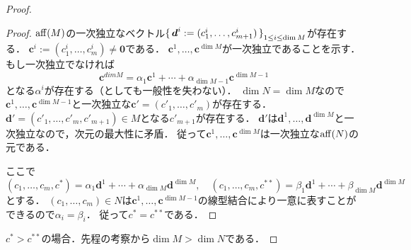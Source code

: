\begin{proof}
\begin{proof}
    \(\operatorname{aff}(M)\)の一次独立なベクトル\(\set{\boldsymbol{d}^i := (c^i_1, \ldots, c^i_{m+1})}_{1\leq i\leq \dim M} \)が存在する．
    \(\boldsymbol{c}^i := (c^i_1, \ldots, c^i_m) \neq \boldsymbol{0}\)である．
    \(\boldsymbol{c}^1 , \ldots, \boldsymbol{c}^{\dim M}\)が一次独立であることを示す．
    もし一次独立でなければ
    \[ \boldsymbol{c}^{dim M} = \alpha_1 \boldsymbol{c}^1 + \cdots +  \alpha_{\dim M-1} \boldsymbol{c}^{\dim M-1} \]
    となる\(\alpha^i\)が存在する（としても一般性を失わない）．
    \(\dim N = \dim M\)なので\(\boldsymbol{c}^1, \ldots, \boldsymbol{c}^{\dim M-1}\)と一次独立な\(\boldsymbol{c}' = (c'_1, \ldots, c'_m)\)が存在する．
    \(\boldsymbol{d}' = (c'_1, \ldots, c'_m, c'_{m+1}) \in M\)となる\(c'_{m+1}\)が存在する．
    \(\boldsymbol{d}'\)は\(\boldsymbol{d}^1, \ldots, \boldsymbol{d}^{\dim M}\)と一次独立なので，次元の最大性に矛盾．
    従って\(\boldsymbol{c}^1, \ldots, \boldsymbol{c}^{\dim M}\)は一次独立な\(\operatorname{aff}(N)\)の元である．

    ここで
    \[
    (c_1, \ldots, c_m, c^*) = \alpha_1 \boldsymbol{d}^1 + \cdots + \alpha_{\dim M} \boldsymbol{d}^{\dim M} , \quad
    (c_1, \ldots, c_m, c^{**}) = \beta_1 \boldsymbol{d}^1 + \cdots + \beta_{\dim M} \boldsymbol{d}^{\dim M}
    \]
    とする．
    \((c_1, \ldots, c_m) \in N\)は\(\boldsymbol{c}^1, \ldots, \boldsymbol{c}^{\dim M-1}\)の線型結合により一意に表すことができるので\(\alpha_i = \beta_i\)．
    従って\(c^* = c^{**}\)である．
  \end{proof}

  \(c^*>c^{**}\)の場合．先程の考察から\(\dim M > \dim N\)である．


\end{proof}
